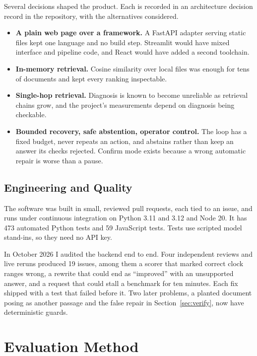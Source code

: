 \documentclass[12pt, a4paper, oneside]{report}
\begin{document}
Several decisions shaped the product. Each is recorded in an architecture
decision record in the repository, with the alternatives considered.
\begin{itemize}
\item \textbf{A plain web page over a framework.} A FastAPI adapter serving
  static files kept one language and no build step. Streamlit would have
  mixed interface and pipeline code, and React would have added a second
  toolchain.
\item \textbf{In-memory retrieval.} Cosine similarity over local files was
  enough for tens of documents and kept every ranking inspectable.
\item \textbf{Single-hop retrieval.} Diagnosis is known to become unreliable
  as retrieval chains grow, and the project's measurements depend on
  diagnosis being checkable.
\item \textbf{Bounded recovery, safe abstention, operator control.} The
  loop has a fixed budget, never repeats an action, and abstains rather than
  keep an answer its checks rejected. Confirm mode exists because a wrong
  automatic repair is worse than a pause.
\end{itemize}

\section{Engineering and Quality}

The software was built in small, reviewed pull requests, each tied to an
issue, and runs under continuous integration on Python 3.11 and 3.12 and
Node 20. It has 473 automated Python tests and 59 JavaScript tests. Tests use
scripted model stand-ins, so they need no API key.

In October 2026 I audited the backend end to end. Four independent reviews
and live reruns produced 19 issues, among them a scorer that marked correct
clock ranges wrong, a rewrite that could end as ``improved'' with an
unsupported answer, and a request that could stall a benchmark for ten
minutes. Each fix shipped with a test that failed before it. Two later problems, a
planted document posing as another passage and the false repair in
Section~\ref{sec:verify}, now have deterministic guards.


\chapter{Evaluation Method}
\label{material-and-methods}
\end{document}
